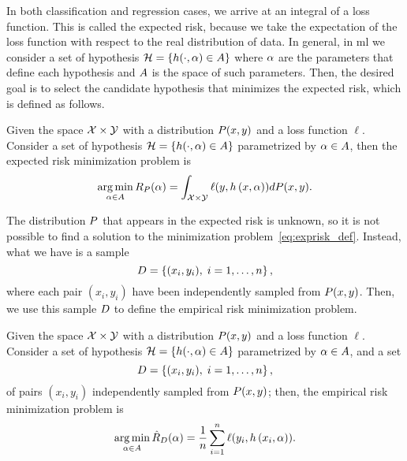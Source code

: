 %
In both classification and regression cases, we arrive at an integral of a loss function.
This is called the expected risk, because we take the expectation of the loss function with respect to the real distribution of data. 
%
In general, in \acrshort{ml} we consider a set of hypothesis $\mathcal{H} = \left\{h(\cdot, \alpha) \in A\right\}$ where $\alpha$ are the parameters that define each hypothesis and $A$ is the space of such parameters. Then, the desired goal is to select the candidate hypothesis that minimizes the expected risk, which is defined as follows.
%
\begin{definition}
    Given the space $\mathcal{X} \times \mathcal{Y}$ with a distribution $P(x, y)$ and a loss function $\ell$. Consider a set of hypothesis $\mathcal{H} = \left\{h(\cdot, \alpha) \in A\right\}$ parametrized by $\alpha \in A$, then the expected risk minimization problem is 
    \begin{equation}
        \label{eq:exprisk_def}
        \argmin_{\param \in \paramspace} \exprisk(\param) = \int_{\Xspace \times \Yspace} \ell(y, \hyp{x}{\param}) d\distf(x, y) .
    \end{equation}
\end{definition}
%
The distribution $P$ that appears in the expected risk is unknown, so it is not possible to find a solution to the minimization problem~\eqref{eq:exprisk_def}.
% 
Instead, what we have is a sample 
\begin{equation}
    \nonumber
    D = \left\{(x_i, y_i), \; i=1, \ldots, n\right\} ,
\end{equation}
where each pair $(x_i, y_i)$ have been independently sampled from $P(x, y)$. 
%
Then, we use this sample $D$ to define the empirical risk minimization problem.
%
\begin{definition}
    Given the space $\mathcal{X} \times \mathcal{Y}$ with a distribution $P(x, y)$ and a loss function $\ell$. Consider a set of hypothesis $\mathcal{H} = \left\{h(\cdot, \alpha) \in A\right\}$ parametrized by $\alpha \in A$, and a set 
    \begin{equation}
        \nonumber
        D = \left\{(x_i, y_i), \; i=1, \ldots, n\right\} ,
    \end{equation}
    of pairs $(x_i, y_i)$ independently sampled from $P(x, y)$;    
    then, the empirical risk minimization problem is 
    \begin{equation}
        \label{eq:emprisk_def}
        \argmin_{\param \in \paramspace} \emprisk(\param) = \frac{1}{\nsamples} \sum_{i=1}^\nsamples \ell(y_i, \hyp{x_i}{\param}) .
    \end{equation}
\end{definition}
